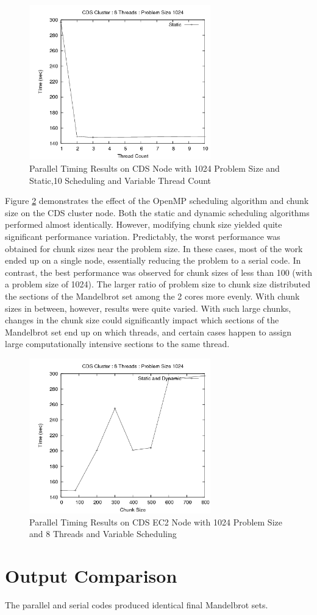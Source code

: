 \documentclass{article}
\begin{document}
\begin{figure}
\centering
\includegraphics[width=0.7\textwidth]{../data/cds_threads.png}
\caption{Parallel Timing Results on CDS Node with 1024 Problem Size and Static,10 Scheduling and Variable Thread Count}
\label{cds_threads}
\end{figure}

Figure \ref{cds_chunk} demonstrates the effect of the OpenMP scheduling algorithm and chunk size on the CDS cluster node. Both the static and dynamic scheduling algorithms performed almost identically. However, modifying chunk size yielded quite significant performance variation. Predictably, the worst performance was obtained for chunk sizes near the problem size. In these cases, most of the work ended up on a single node, essentially reducing the problem to a serial code. In contrast, the best performance was observed for chunk sizes of less than 100 (with a problem size of 1024). The larger ratio of problem size to chunk size distributed the sections of the Mandelbrot set among the 2 cores more evenly. With chunk sizes in between, however, results were quite varied. With such large chunks, changes in the chunk size could significantly impact which sections of the Mandelbrot set end up on which threads, and certain cases happen to assign large computationally intensive sections to the same thread.

\begin{figure}
\centering
\includegraphics[width=0.7\textwidth]{../data/cds_block.png}
\caption{Parallel Timing Results on CDS EC2 Node with 1024 Problem Size and 8 Threads and Variable Scheduling}
\label{cds_chunk}
\end{figure}


\section{Output Comparison}

The parallel and serial codes produced identical final Mandelbrot sets.
\end{document}
